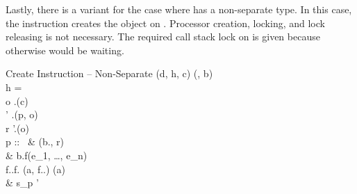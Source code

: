 Lastly, there is a variant for the case where  has a non-separate type. In this case, the instruction creates the object on . Processor creation, locking, and lock releasing is not necessary. The required call stack lock on  is given because otherwise  would be waiting.

\inferencerule
	{Create Instruction -- Non-Separate}
	{
		(d, h, c) \mathematicaldefinition \typefromtypingenvironment(\typingenvironment, b) \\
		h = \bullet \\
		o \mathematicaldefinition \state.\newobjectfeature(c) \\
		\state' \mathematicaldefinition \state.\addobjectfeature(p, o) \\
		r \mathematicaldefinition \state'.(o) \\
	}
	{}
	{
		\configuration
			{
				p :: \ & \writevalueoperation(b.\namefeature, r) \statementseparator \\
				& b.f(e_{1}, \ldots, e_{n}) \statementseparator \\
				\multilineconditionaloperation
						{\neg f.\classtypefeature.\invariantexistsfeature \vee f.\isexportedfeature}
						{\nooperation}
						{\evaluateoperation(a, f.\classtypefeature.\invariantfeature) \statementseparator \waitoperation(a)} \statementseparator \\
				& s_{p}
			}
			{\state'}
	}
 
